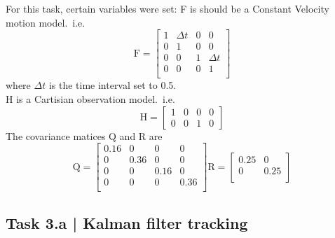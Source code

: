 \documentclass[conference]{IEEEtran}
\begin{document}
    For this task, certain variables were set:
    F is should be a Constant Velocity motion model.\ i.e.
    \begin{equation}
        \text{F} = \begin{bmatrix}
            1 & \Delta t & 0 & 0        \\
            0 & 1        & 0 & 0        \\
            0 & 0        & 1 & \Delta t \\
            0 & 0        & 0 & 1        \\
        \end{bmatrix}
    \end{equation}
    where $\Delta t$ is the time interval set to 0.5.\\
    H is a Cartisian observation model.\ i.e.
    \begin{equation}
        \text{H} = \begin{bmatrix}
            1&0&0&0\\
            0&0&1&0
        \end{bmatrix}
    \end{equation}
    The covariance matices Q and R are
    \begin{equation}
        \text{Q} = \begin{bmatrix}
            0.16 & 0 & 0 & 0 \\
            0 & 0.36 & 0 & 0 \\
            0 & 0 & 0.16 & 0 \\ 
            0 & 0 & 0 & 0.36 \\ 
        \end{bmatrix}
        \text{R} = \begin{bmatrix}
            0.25 & 0 \\ 
            0 & 0.25 \\ 
        \end{bmatrix}
    \end{equation}



    \subsection*{Task 3.a | Kalman filter tracking}
\end{document}
